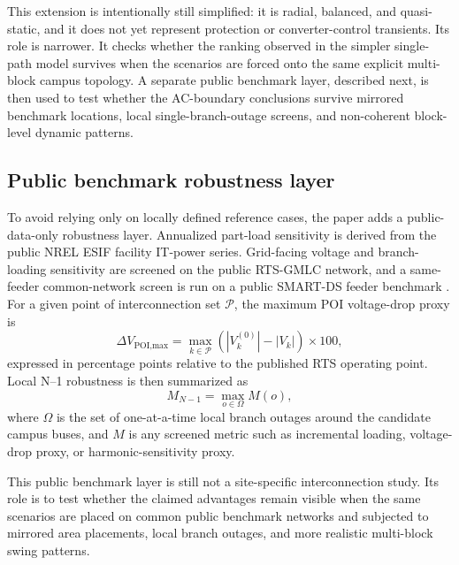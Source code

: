 \documentclass[11pt]{article}
\begin{document}
This extension is intentionally still simplified: it is radial, balanced, and quasi-static, and it does not yet represent protection or converter-control transients. Its role is narrower. It checks whether the ranking observed in the simpler single-path model survives when the scenarios are forced onto the same explicit multi-block campus topology. A separate public benchmark layer, described next, is then used to test whether the AC-boundary conclusions survive mirrored benchmark locations, local single-branch-outage screens, and non-coherent block-level dynamic patterns.

\subsection{Public benchmark robustness layer}
To avoid relying only on locally defined reference cases, the paper adds a public-data-only robustness layer. Annualized part-load sensitivity is derived from the public NREL ESIF facility IT-power series. Grid-facing voltage and branch-loading sensitivity are screened on the public RTS-GMLC network, and a same-feeder common-network screen is run on a public SMART-DS feeder benchmark \cite{RTSGMLC2026,SMARTDS2023}. For a given point of interconnection set $\mathcal{P}$, the maximum POI voltage-drop proxy is
\begin{equation}
\Delta V_{\text{POI,max}} = \max_{k \in \mathcal{P}} \left( \left|V_k^{(0)}\right| - \left|V_k\right| \right) \times 100,
\end{equation}
expressed in percentage points relative to the published RTS operating point. Local N--1 robustness is then summarized as
\begin{equation}
M_{N-1} = \max_{o \in \Omega} M(o),
\end{equation}
where $\Omega$ is the set of one-at-a-time local branch outages around the candidate campus buses, and $M$ is any screened metric such as incremental loading, voltage-drop proxy, or harmonic-sensitivity proxy.

This public benchmark layer is still not a site-specific interconnection study. Its role is to test whether the claimed advantages remain visible when the same scenarios are placed on common public benchmark networks and subjected to mirrored area placements, local branch outages, and more realistic multi-block swing patterns.
\end{document}
